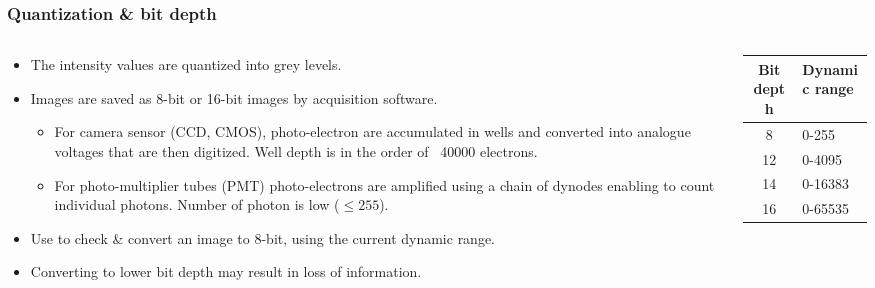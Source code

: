 \documentclass[ignorenonframetext,aspectratio=169,10pt,xcolor=table]{beamer}
\begin{document}
\begin{frame} \frametitle{Quantization \& bit depth}

  \begin{columns}

    \begin{column}{0.7\textwidth}
      \begin{itemize} \setlength\itemsep{1em}
        \item The intensity values are quantized into grey levels.
        \item Images are saved as 8-bit or 16-bit images by acquisition
              software.
              \begin{itemize}
                \item For camera sensor (CCD, CMOS), photo-electron are
                      accumulated in wells and converted into analogue voltages that are
                      then digitized. Well depth is in the order of ~40000 electrons.
                \item For photo-multiplier tubes (PMT) photo-electrons are
                      amplified using a chain of dynodes enabling to count individual
                      photons. Number of photon is low ($\leq 255$).
              \end{itemize}
      \end{itemize}
      \begin{itemize}
        \item Use  to check \& convert an image
              to 8-bit, using the current dynamic range.
        \item Converting to lower bit depth may result in loss of information.
      \end{itemize}
    \end{column}

    \begin{column}{0.3\textwidth}
      \begin{center} \small {}
        \begin{tabular}{cl}
          Bit depth & Dynamic range \\ \hline 8 &
          0-255                     \\ 12 & 0-4095\\ 14 & 0-16383\\ 16 & 0-65535
        \end{tabular}
      \end{center}

    \end{column}

  \end{columns}

\end{frame}
\end{document}
